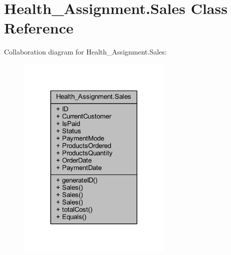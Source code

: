 \hypertarget{class_health___assignment_1_1_sales}{}\section{Health\+\_\+\+Assignment.\+Sales Class Reference}
\label{class_health___assignment_1_1_sales}


Collaboration diagram for Health\+\_\+\+Assignment.\+Sales\+:\nopagebreak
\begin{figure}[H]
\begin{center}
\leavevmode
\includegraphics[width=209pt]{class_health___assignment_1_1_sales__coll__graph}
\end{center}
\end{figure}
